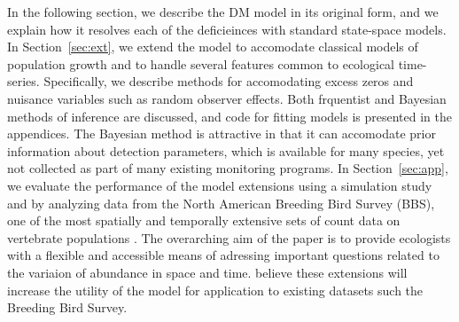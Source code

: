 \documentclass[12pt]{article}
\begin{document}
In the following section, we describe the DM model in its original
form, and we explain how it resolves each of the deficieinces with
standard state-space models. In Section~\ref{sec:ext}, we extend the
model to accomodate classical models of population growth and to
handle several features common to ecological
time-series. Specifically, we describe methods for accomodating excess
zeros and nuisance variables such as random observer effects. Both
frquentist and Bayesian methods of inference are discussed, and code
for fitting models is presented in the appendices. The Bayesian method
is attractive in that it can accomodate prior information about
detection parameters, which is available for many species, yet not
collected as part of many existing monitoring programs. In
Section~\ref{sec:app}, we evaluate the performance of the model
extensions using a simulation study and by analyzing data from the
North American Breeding Bird Survey (BBS), one of
the most spatially and temporally extensive sets of count data on
vertebrate populations \citep{robbins_etal:1986}. The overarching aim
of  the paper is to provide ecologists with a flexible and accessible means of
adressing important questions related to the variaion of abundance in
space and time.
believe these extensions will increase the utility of the model for
application to existing datasets such the Breeding Bird Survey.
\end{document}
